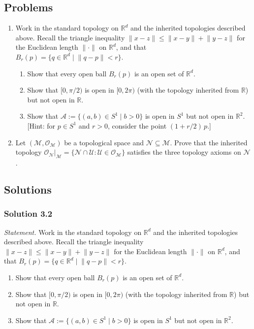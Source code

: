 \documentclass[11pt]{article}
\begin{document}
\subsection*{Problems}

\begin{enumerate}[label=\textbf{3.\arabic*}, leftmargin=2.2cm, start=2]

\item \label{prob:balls-and-inherited}
Work in the standard topology on $\mathbb R^d$ and the inherited topologies described above. Recall the triangle inequality $\lVert x-z\rVert\le\lVert x-y\rVert+\lVert y-z\rVert$ for the Euclidean length $\lVert\cdot\rVert$ on $\mathbb R^d$, and that $B_r(p)=\{q\in\mathbb R^d\mid\lVert q-p\rVert<r\}$.
\begin{enumerate}[label=(\alph*)]
  \item Show that every open ball $B_r(p)$ is an open set of $\mathbb R^d$.
  \item Show that $[0,\pi/2)$ is open in $[0,2\pi)$ (with the topology inherited from $\mathbb R$) but not open in $\mathbb R$.
  \item Show that $\mathcal A:=\{(a,b)\in S^1\mid b>0\}$ is open in $S^1$ but not open in $\mathbb R^2$. [Hint: for $p\in S^1$ and $r>0$, consider the point $(1+r/2)\,p$.]
\end{enumerate}

\item \label{prob:inherited-is-topology}
Let $(\mathcal M,\mathcal O_{\mathcal M})$ be a topological space and $\mathcal N\subseteq\mathcal M$. Prove that the inherited topology $\mathcal O_{\mathcal N}|_{\mathcal M}=\{\mathcal N\cap\mathcal U:\mathcal U\in\mathcal O_{\mathcal M}\}$ satisfies the three topology axioms on $\mathcal N$.

\end{enumerate}

\subsection*{Solutions}

\subsubsection*{Solution 3.2}

\noindent\textit{Statement.} Work in the standard topology on $\mathbb R^d$ and the inherited topologies described above. Recall the triangle inequality $\lVert x-z\rVert\le\lVert x-y\rVert+\lVert y-z\rVert$ for the Euclidean length $\lVert\cdot\rVert$ on $\mathbb R^d$, and that $B_r(p)=\{q\in\mathbb R^d\mid\lVert q-p\rVert<r\}$.
\begin{enumerate}[label=(\alph*)]
  \item Show that every open ball $B_r(p)$ is an open set of $\mathbb R^d$.
  \item Show that $[0,\pi/2)$ is open in $[0,2\pi)$ (with the topology inherited from $\mathbb R$) but not open in $\mathbb R$.
  \item Show that $\mathcal A:=\{(a,b)\in S^1\mid b>0\}$ is open in $S^1$ but not open in $\mathbb R^2$.
\end{enumerate}
\end{document}
